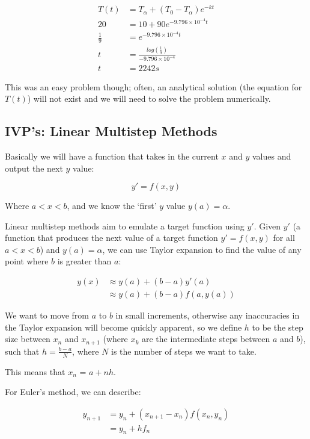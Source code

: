 \[
\begin{split}
  T(t) &= T_\alpha + (T_0 - T_\alpha)e^{-kt}\\
  20 &= 10 + 90e^{-9.796\times10^{-4}t}\\
  \frac{1}{9} &= e^{-9.796\times10^{-4}t}\\
  t &= \frac{log(\frac{1}{9})}{-9.796\times10^{-4}}\\
  t &= 2242s
\end{split}
\]

This was an easy problem though; often, an analytical solution (the
equation for $T(t)$) will not exist and we will need to solve the
problem numerically.

\subsection{IVP's: Linear Multistep Methods}

Basically we will have a function that takes in the current $x$ and
$y$ values and output the next $y$ value:

\[
  y' = f(x,y)
\]

Where $a < x < b$, and we know the `first' $y$ value $y(a) = \alpha$.

Linear multistep methods aim to emulate a target function using
$y'$. Given $y'$ (a function that produces the next value of a target
function $y' = f(x,y)$ for all $a < x < b$) and $y(a) = \alpha$, we
can use Taylor expansion to find the value of any point where $b$ is
greater than $a$:


\[
\begin{split}
  y(x) &\approx y(a) + (b - a)y'(a)\\
       &\approx y(a) + (b - a)f(a, y(a))
\end{split}
\]

We want to move from $a$ to $b$ in small increments, otherwise any
inaccuracies in the Taylor expansion will become quickly apparent, so
we define $h$ to be the step size between $x_n$ and $x_{n+1}$ (where
$x_k$ are the intermediate steps between $a$ and $b$), such that $h
= \frac{b - a}{N}$, where $N$ is the number of steps we want to take.

This means that $x_n$ = $a + nh$.

For Euler's method, we can describe:

\[
\begin{split}
  y_{n+1} &= y_n + (x_{n+1} - x_n)f(x_n, y_n)\\
          &= y_n + hf_n
\end{split}
\]

